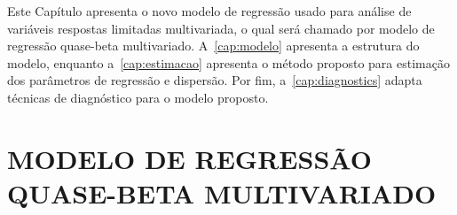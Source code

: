 
Este Capítulo apresenta o novo modelo de regressão usado para análise de
variáveis respostas limitadas multivariada, o qual será chamado por
modelo de regressão quase-beta multivariado. A~\autoref{cap:modelo}
apresenta a estrutura do modelo, enquanto a~\autoref{cap:estimacao}
apresenta o método proposto para estimação dos parâmetros de regressão e
dispersão. Por fim, a~\autoref{cap:diagnostics} adapta técnicas de
diagnóstico para o modelo proposto.

\section{MODELO DE REGRESSÃO QUASE-BETA MULTIVARIADO}
\label{cap:modelo}

